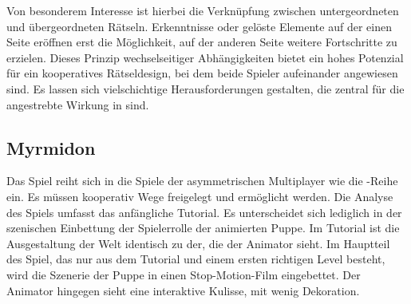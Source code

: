 Von besonderem Interesse ist hierbei die Verknüpfung zwischen untergeordneten und übergeordneten Rätseln. Erkenntnisse oder gelöste Elemente auf der einen Seite eröffnen erst die Möglichkeit, auf der anderen Seite weitere Fortschritte zu erzielen. Dieses Prinzip wechselseitiger Abhängigkeiten bietet ein hohes Potenzial für ein kooperatives Rätseldesign, bei dem beide Spieler aufeinander angewiesen sind. Es lassen sich vielschichtige Herausforderungen gestalten, die zentral für die angestrebte Wirkung in  sind.

\subsection{Myrmidon}
Das Spiel  reiht sich in die Spiele der asymmetrischen Multiplayer wie die -Reihe ein. Es müssen kooperativ Wege freigelegt und ermöglicht werden. Die Analyse des Spiels umfasst das anfängliche Tutorial. Es unterscheidet sich lediglich in der szenischen Einbettung der Spielerrolle der animierten Puppe. Im Tutorial ist die Ausgestaltung der Welt identisch zu der, die der Animator sieht. Im Hauptteil des Spiel, das nur aus dem Tutorial und einem ersten richtigen Level besteht, wird die Szenerie der Puppe in einen Stop-Motion-Film eingebettet. Der Animator hingegen sieht eine interaktive Kulisse, mit wenig Dekoration.

